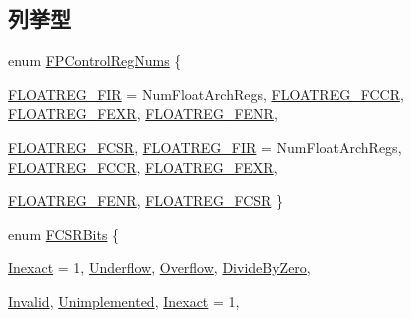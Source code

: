 \subsection*{列挙型}
\begin{DoxyCompactItemize}
\item 
enum \hyperlink{namespaceMipsISA_a5c25eb02ee099af970c3b8d2e4f5dc43}{FPControlRegNums} \{ \par
\hyperlink{namespaceMipsISA_a5c25eb02ee099af970c3b8d2e4f5dc43a3b749b1d9b33241fa39082cd47a5401e}{FLOATREG\_\-FIR} =  NumFloatArchRegs, 
\hyperlink{namespaceMipsISA_a5c25eb02ee099af970c3b8d2e4f5dc43a41a9157321aeb48a256911179ea15bd1}{FLOATREG\_\-FCCR}, 
\hyperlink{namespaceMipsISA_a5c25eb02ee099af970c3b8d2e4f5dc43a333c1e7b14ba5577023b0ab300c443ae}{FLOATREG\_\-FEXR}, 
\hyperlink{namespaceMipsISA_a5c25eb02ee099af970c3b8d2e4f5dc43a63e4bfba7a5762656f4d1690d816175d}{FLOATREG\_\-FENR}, 
\par
\hyperlink{namespaceMipsISA_a5c25eb02ee099af970c3b8d2e4f5dc43afb4cd967061a283e84d18cfc4e8a5a7b}{FLOATREG\_\-FCSR}, 
\hyperlink{namespaceMipsISA_a5c25eb02ee099af970c3b8d2e4f5dc43a3b749b1d9b33241fa39082cd47a5401e}{FLOATREG\_\-FIR} =  NumFloatArchRegs, 
\hyperlink{namespaceMipsISA_a5c25eb02ee099af970c3b8d2e4f5dc43a41a9157321aeb48a256911179ea15bd1}{FLOATREG\_\-FCCR}, 
\hyperlink{namespaceMipsISA_a5c25eb02ee099af970c3b8d2e4f5dc43a333c1e7b14ba5577023b0ab300c443ae}{FLOATREG\_\-FEXR}, 
\par
\hyperlink{namespaceMipsISA_a5c25eb02ee099af970c3b8d2e4f5dc43a63e4bfba7a5762656f4d1690d816175d}{FLOATREG\_\-FENR}, 
\hyperlink{namespaceMipsISA_a5c25eb02ee099af970c3b8d2e4f5dc43afb4cd967061a283e84d18cfc4e8a5a7b}{FLOATREG\_\-FCSR}
 \}
\item 
enum \hyperlink{namespaceMipsISA_a79915055f9ee1b5f815a7998dbc159f7}{FCSRBits} \{ \par
\hyperlink{namespaceMipsISA_a79915055f9ee1b5f815a7998dbc159f7a7a184d7d7f7ed872956f05a5624e76f1}{Inexact} =  1, 
\hyperlink{namespaceMipsISA_a79915055f9ee1b5f815a7998dbc159f7a32718a880dad0629f0eacfc00c357a80}{Underflow}, 
\hyperlink{namespaceMipsISA_a79915055f9ee1b5f815a7998dbc159f7aee97c47c58ef6b199b0954a759735b60}{Overflow}, 
\hyperlink{namespaceMipsISA_a79915055f9ee1b5f815a7998dbc159f7ad2a1a3ed2bdff06d31747fdac31abf56}{DivideByZero}, 
\par
\hyperlink{namespaceMipsISA_a79915055f9ee1b5f815a7998dbc159f7abf58891c7387fb7a63807ecf46aef000}{Invalid}, 
\hyperlink{namespaceMipsISA_a79915055f9ee1b5f815a7998dbc159f7ac64569bb9cffe0532bc43b52d7b6c383}{Unimplemented}, 
\hyperlink{namespaceMipsISA_a79915055f9ee1b5f815a7998dbc159f7a7a184d7d7f7ed872956f05a5624e76f1}{Inexact} =  1, 

\end{DoxyCompactItemize}
